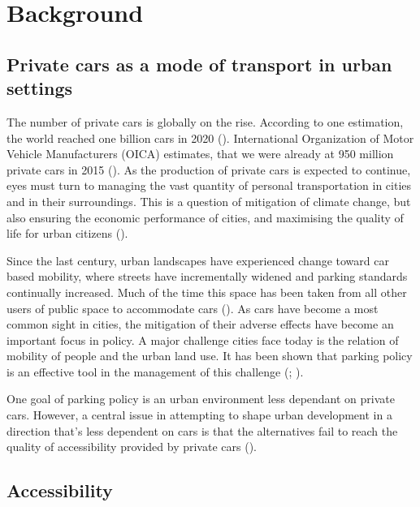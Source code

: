 \section{Background}
\subsection{Private cars as a mode of transport in urban settings}
\justify


The number of private cars is globally on the rise. According to one estimation, the world reached one billion cars in 2020 (\cite{Sperling2009}). International Organization of Motor Vehicle Manufacturers (OICA) estimates, that we were already at 950 million private cars in 2015 (\cite{OICA2020}). As the production of private cars is expected to continue, eyes must turn to managing the vast quantity of personal transportation in cities and in their surroundings. This is a question of mitigation of climate change, but also ensuring the economic performance of cities, and maximising the quality of life for urban citizens (\cite{Bertolini2003}).

Since the last century, urban landscapes have experienced change toward car based mobility, where streets have incrementally widened and parking standards continually increased. Much of the time this space has been taken from all other users of public space to accommodate cars (\cite{Cervero2017}). As cars have become a most common sight in cities, the mitigation of their adverse effects have become an important focus in policy. A major challenge cities face today is the relation of mobility of people and the urban land use. It has been shown that parking policy is an effective tool in the management of this challenge (\cite{Diallo2015}; \cite{Marsden2006}).

One goal of parking policy is an urban environment less dependant on private cars. However, a central issue in attempting to shape urban development in a direction that's less dependent on cars is that the alternatives fail to reach the quality of accessibility provided by private cars (\cite{Bertolini2003}).

\newpage
\subsection{Accessibility}
\justify

